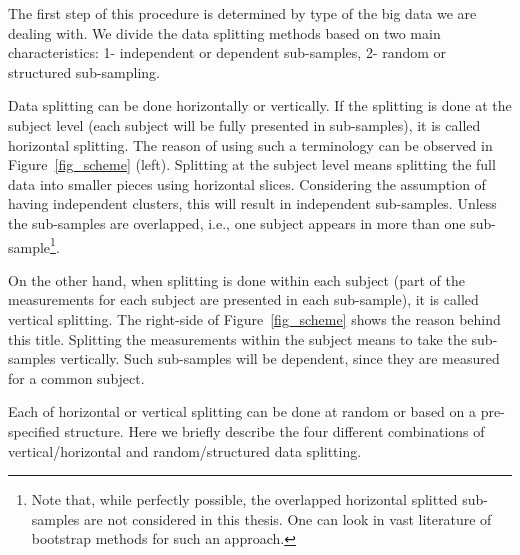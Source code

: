 \documentclass[14pt]{article}
\begin{document}
The first step of this procedure is determined by type of the big data we are dealing with. We divide the data splitting methods based on two main characteristics: 1- independent or dependent sub-samples, 2- random or structured sub-sampling.

Data splitting can be done horizontally or vertically. If the splitting is done at the subject level (each subject will be fully presented in sub-samples), it is called horizontal splitting. The reason of using such a terminology can be observed in Figure~\ref{fig_scheme} (left). Splitting at the subject level means splitting the full data into smaller pieces using horizontal slices. Considering the assumption of having independent clusters, this will result in independent sub-samples. Unless the sub-samples are overlapped, i.e., one subject appears in more than one sub-sample\footnote{Note that, while perfectly possible, the overlapped horizontal splitted sub-samples are not considered in this thesis. One can look in vast literature of bootstrap methods for such an approach.}.

On the other hand, when splitting is done within each subject (part of the measurements for each subject are presented in each sub-sample), it is called vertical splitting. The right-side of Figure~\ref{fig_scheme} shows the reason behind this title. Splitting the measurements within the subject means to take the sub-samples vertically. Such sub-samples will be dependent, since they are measured for a common subject.

Each of horizontal or vertical splitting can be done at random or based on a pre-specified structure.  Here we briefly describe the four different combinations of vertical/horizontal and random/structured data splitting.
\end{document}

